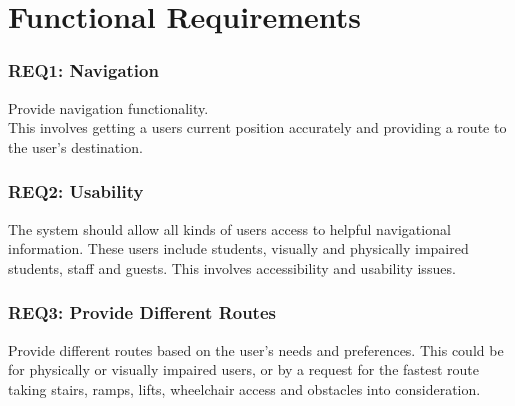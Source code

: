 \section{Functional Requirements}

		\subsubsection {REQ1: Navigation}
			Provide navigation functionality.\\ This involves getting a users current position accurately and providing a route to the user's destination.
			
		\subsubsection{REQ2: Usability}
			The system should allow all kinds of users access to helpful navigational information. These users include students, visually and physically impaired students, staff and guests. This involves accessibility and usability issues.
			
		\subsubsection{REQ3: Provide Different Routes}
			Provide different routes based on the user's needs and preferences. This could be for physically or visually impaired users, or by a request for the fastest route taking stairs, ramps, lifts, wheelchair access and obstacles into consideration. %
			
